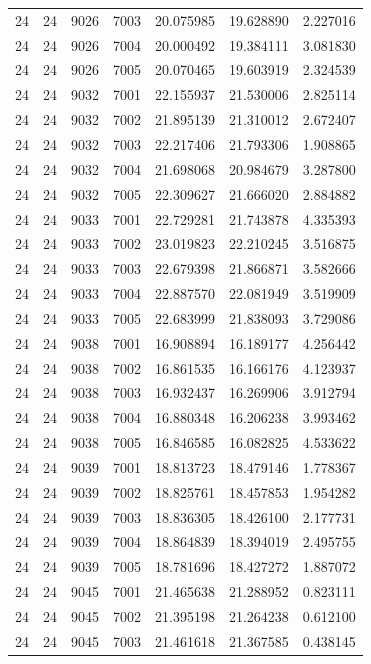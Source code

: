 \begin{table}
\begin{tabular}{rrrrrrr}
24 & 24 & 9026 & 7003 & 20.075985 & 19.628890 & 2.227016 \\
24 & 24 & 9026 & 7004 & 20.000492 & 19.384111 & 3.081830 \\
24 & 24 & 9026 & 7005 & 20.070465 & 19.603919 & 2.324539 \\
24 & 24 & 9032 & 7001 & 22.155937 & 21.530006 & 2.825114 \\
24 & 24 & 9032 & 7002 & 21.895139 & 21.310012 & 2.672407 \\
24 & 24 & 9032 & 7003 & 22.217406 & 21.793306 & 1.908865 \\
24 & 24 & 9032 & 7004 & 21.698068 & 20.984679 & 3.287800 \\
24 & 24 & 9032 & 7005 & 22.309627 & 21.666020 & 2.884882 \\
24 & 24 & 9033 & 7001 & 22.729281 & 21.743878 & 4.335393 \\
24 & 24 & 9033 & 7002 & 23.019823 & 22.210245 & 3.516875 \\
24 & 24 & 9033 & 7003 & 22.679398 & 21.866871 & 3.582666 \\
24 & 24 & 9033 & 7004 & 22.887570 & 22.081949 & 3.519909 \\
24 & 24 & 9033 & 7005 & 22.683999 & 21.838093 & 3.729086 \\
24 & 24 & 9038 & 7001 & 16.908894 & 16.189177 & 4.256442 \\
24 & 24 & 9038 & 7002 & 16.861535 & 16.166176 & 4.123937 \\
24 & 24 & 9038 & 7003 & 16.932437 & 16.269906 & 3.912794 \\
24 & 24 & 9038 & 7004 & 16.880348 & 16.206238 & 3.993462 \\
24 & 24 & 9038 & 7005 & 16.846585 & 16.082825 & 4.533622 \\
24 & 24 & 9039 & 7001 & 18.813723 & 18.479146 & 1.778367 \\
24 & 24 & 9039 & 7002 & 18.825761 & 18.457853 & 1.954282 \\
24 & 24 & 9039 & 7003 & 18.836305 & 18.426100 & 2.177731 \\
24 & 24 & 9039 & 7004 & 18.864839 & 18.394019 & 2.495755 \\
24 & 24 & 9039 & 7005 & 18.781696 & 18.427272 & 1.887072 \\
24 & 24 & 9045 & 7001 & 21.465638 & 21.288952 & 0.823111 \\
24 & 24 & 9045 & 7002 & 21.395198 & 21.264238 & 0.612100 \\
24 & 24 & 9045 & 7003 & 21.461618 & 21.367585 & 0.438145 \\

\end{tabular}
\end{table}
